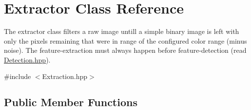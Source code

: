 \hypertarget{classExtractor}{}\section{Extractor Class Reference}
\label{classExtractor}


The extractor class filters a raw image untill a simple binary image is left with only the pixels remaining that were in range of the configured color range (minus noise). The feature-\/extraction must always happen before feature-\/detection (read \hyperlink{Detection_8hpp_source}{Detection.\+hpp}).  




{\ttfamily \#include $<$Extraction.\+hpp$>$}

\subsection*{Public Member Functions}
